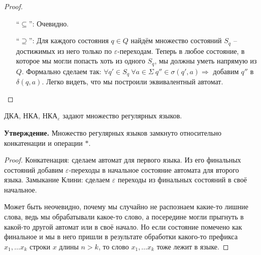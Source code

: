 \begin{proof} \quad 
    
    \begin{enumerate}
        \item[``$\subseteq$'':] Очевидно.
        \item[``$\supseteq$'':] Для каждого состояния $q \in Q$ найдём множество состояний $S_q$ -- достижимых из него только по $\varepsilon$-переходам.
        Теперь в любое состояние, в которое мы могли попасть хоть из одного $S_q$, мы должны уметь напрямую из $Q$. Формально сделаем так: 
        $\forall q' \in S_q\ \forall a \in \Sigma\ q'' \in \sigma(q', a) \Rightarrow$ добавим $q''$ в $\delta(q, a)$. Легко видеть, что мы построили эквивалентный автомат.
    \end{enumerate}
\end{proof}

ДКА, НКА, $\text{НКА}_\varepsilon$ задают множество регулярных языков.

\textbf{Утверждение.} Множество регулярных языков замкнуто относительно конкатенации и операции $*$.

\begin{proof}
    Конкатенация: сделаем автомат для первого языка. Из его финальных состояний добавим $\varepsilon$-переходы в начальное состояние автомата для второго языка.
    Замыкание Клини: сделаем $\varepsilon$ переходы из финальных состояний в своё начальное.

    Может быть неочевидно, почему мы случайно не распознаем какие-то лишние слова, ведь мы обрабатывали какое-то слово, а посередине могли прыгнуть в какой-то другой автомат или в своё начало. Но если состояние помечено как финальное и мы в него пришли в результате обработки какого-то префикса $x_1, \dots x_k$ строки $x$ длины $n > k$, то слово $x_1, \dots x_k$ тоже лежит в языке.
\end{proof}

